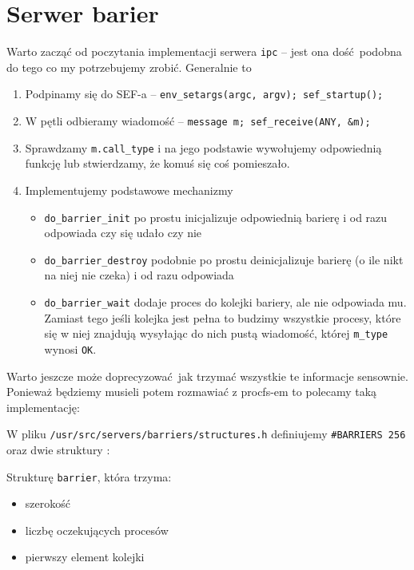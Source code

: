 \section{Serwer barier}
    Warto zacząć od poczytania implementacji serwera \texttt{ipc} -- jest ona dość podobna do tego co my potrzebujemy zrobić. Generalnie to
    \begin{enumerate}
        \item Podpinamy się do SEF-a -- \texttt{env\_setargs(argc, argv); sef\_startup();}
        \item W pętli odbieramy wiadomość -- \texttt{message m; sef\_receive(ANY, &m);}
        \item Sprawdzamy \texttt{m.call\_type} i na jego podstawie wywołujemy odpowiednią funkcję lub stwierdzamy, że komuś się coś pomieszało.
        \item Implementujemy podstawowe mechanizmy
            \begin{itemize}
                \item \texttt{do\_barrier\_init} po prostu inicjalizuje odpowiednią barierę i od razu odpowiada czy się udało czy nie
                \item \texttt{do\_barrier\_destroy} podobnie po prostu deinicjalizuje barierę (o ile nikt na niej nie czeka) i od razu odpowiada
                \item \texttt{do\_barrier\_wait} dodaje proces do kolejki bariery, ale nie odpowiada mu.
                Zamiast tego jeśli kolejka jest pełna to budzimy wszystkie procesy, które się w niej znajdują wysyłając do nich pustą wiadomość, której \texttt{m\_type} wynosi \texttt{OK}.
            \end{itemize}
        
    \end{enumerate}

    Warto jeszcze może doprecyzować jak trzymać wszystkie te informacje sensownie.
    Ponieważ będziemy musieli potem rozmawiać z procfs-em to polecamy taką implementację:
    
    W pliku \texttt{/usr/src/servers/barriers/structures.h} definiujemy \texttt{\#BARRIERS 256} 
    oraz dwie struktury :
    
    Strukturę \texttt{barrier}, która trzyma:
    \begin{itemize}
        \item szerokość
        \item liczbę oczekujących procesów
        \item pierwszy element kolejki
    \end{itemize}
    
